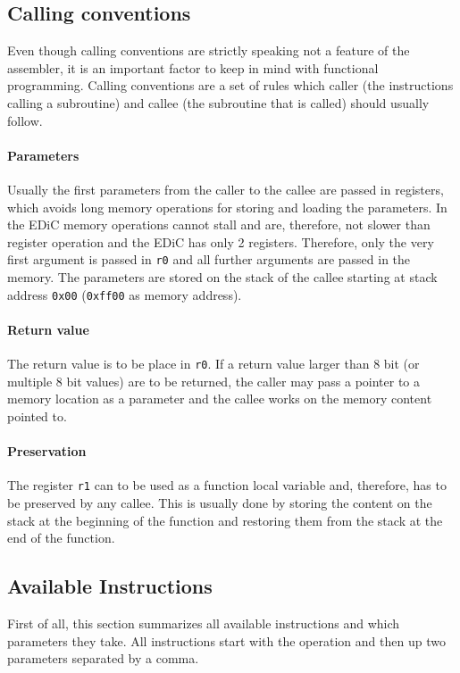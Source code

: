 \subsection{Calling conventions}
Even though calling conventions are strictly speaking not a feature of the assembler, it is an important factor to keep in mind with functional programming.
Calling conventions are a set of rules which caller (the instructions calling a subroutine) and callee (the subroutine that is called) should usually follow.
\paragraph{Parameters}
Usually the first parameters from the caller to the callee are passed in registers, which avoids long memory operations for storing and loading the parameters.
In the \gls{EDiC} memory operations cannot stall and are, therefore, not slower than register operation and the \gls{EDiC} has only 2 registers.
Therefore, only the very first argument is passed in \texttt{r0} and all further arguments are passed in the memory.
The parameters are stored on the stack of the callee starting at stack address \texttt{0x00} (\texttt{0xff00} as memory address).
\paragraph{Return value}
The return value is to be place in \texttt{r0}.
If a return value larger than 8 bit (or multiple 8 bit values) are to be returned, the caller may pass a pointer to a memory location as a parameter and the callee works on the memory content pointed to.
\paragraph{Preservation}
The register \texttt{r1} can to be used as a function local variable and, therefore, has to be preserved by any callee.
This is usually done by storing the content on the stack at the beginning of the function and restoring them from the stack at the end of the function.

\subsection{Available Instructions}
First of all, this section summarizes all available instructions and which parameters they take.
All instructions start with the operation and then up two parameters separated by a comma.


